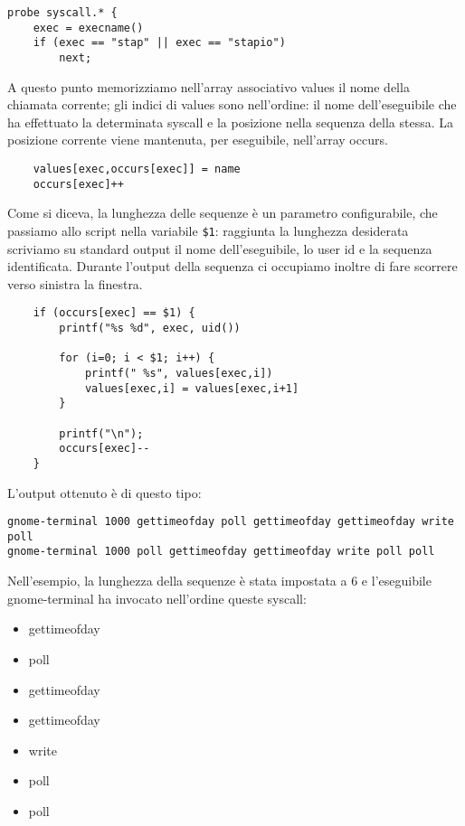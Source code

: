 \documentclass[11pt]{article}
\begin{document}
\begin{lstlisting}
probe syscall.* {
    exec = execname()
    if (exec == "stap" || exec == "stapio")
        next;
\end{lstlisting}

A questo punto memorizziamo nell'array associativo values il nome della
chiamata corrente; gli indici di values sono nell'ordine: il nome
dell'eseguibile che ha effettuato la determinata syscall e la posizione nella
sequenza della stessa. La posizione corrente viene mantenuta, per eseguibile,
nell'array occurs.

\begin{lstlisting}
    values[exec,occurs[exec]] = name
    occurs[exec]++
\end{lstlisting}

Come si diceva, la lunghezza delle sequenze è un parametro configurabile, che
passiamo allo script nella variabile \verb|$1|: raggiunta la lunghezza
desiderata scriviamo su standard output il nome dell'eseguibile, lo user id e
la sequenza identificata. Durante l'output della sequenza ci occupiamo inoltre
di fare scorrere verso sinistra la finestra.

\begin{lstlisting}
    if (occurs[exec] == $1) {
        printf("%s %d", exec, uid())

        for (i=0; i < $1; i++) {
            printf(" %s", values[exec,i])
            values[exec,i] = values[exec,i+1]
        }

        printf("\n");
        occurs[exec]--
    }
\end{lstlisting}

L'output ottenuto è di questo tipo:

\begin{lstlisting}
gnome-terminal 1000 gettimeofday poll gettimeofday gettimeofday write poll
gnome-terminal 1000 poll gettimeofday gettimeofday write poll poll
\end{lstlisting}

Nell'esempio, la lunghezza della sequenze è stata impostata a 6 e l'eseguibile
gnome-terminal ha invocato nell'ordine queste syscall:

\begin{itemize}
    \item gettimeofday
    \item poll 
    \item gettimeofday 
    \item gettimeofday 
    \item write 
    \item poll 
    \item poll
\end{itemize}
\end{document}
